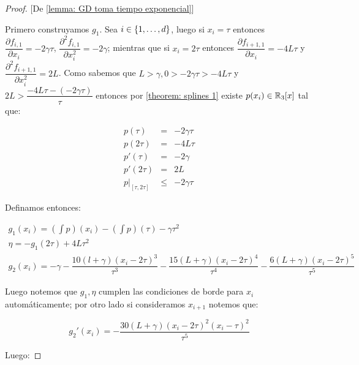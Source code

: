 \begin{proof}{[De \ref{lemma: GD toma tiempo exponencial}]}
	
	Primero construyamos $g_1$. Sea $i \in \left\lbrace1, \dots, d\right\rbrace$, luego si $x_i = \tau$ entonces $\dfrac{\partial f_{i,1}}{\partial x_i} = -2\gamma\tau$, $\dfrac{\partial^2 f_{i,1}}{\partial x_i^2} = -2\gamma$; mientras que si $x_i = 2\tau$ entonces $\dfrac{\partial f_{i+1,1}}{\partial x_i} = -4L\tau$ y $\dfrac{\partial^2 f_{i+1,1}}{\partial x_i^2} = 2L$. Como sabemos que $L > \gamma, 0 > -2\gamma\tau > -4L\tau$ y $2L > \dfrac{-4L\tau - \left(-2\gamma \tau\right)}{\tau}$ entonces por \ref{theorem: splines 1} existe $p(x_i) \in {\mathbb{R}}_3[x]$ tal que:
	
	\begin{equation*}
		\begin{aligned}
			p(\tau) & = & -2\gamma \tau \\
			p(2\tau) & = & -4L\tau \\
			p'(\tau) & = & -2\gamma \\
			p'(2\tau) & = & 2L \\
			p \vert_{\left[\tau, 2\tau\right]} & \leq & -2 \gamma \tau
		\end{aligned}
	\end{equation*}
	
	Definamos entonces:
	
	\begin{equation*}
	\begin{array}{l}
		g_1(x_i) = \left(\int p\right) (x_i) - \left(\int p\right) (\tau) - \gamma \tau^2 \\
		\eta = - g_1(2\tau) + 4L \tau^2 \\
		g_2(x_i) = -\gamma - \dfrac{10 (l+\gamma) \left(x_i - 2\tau\right)^3}{\tau^3} - \dfrac{15 (L+\gamma)\left(x_i - 2\tau\right)^4}{\tau^4} - \dfrac{6 (L+\gamma)\left(x_i - 2\tau\right)^5}{\tau^5}
	\end{array}
	\end{equation*}
	
	Luego notemos que $g_1, \eta$ cumplen las condiciones de borde para $x_i$ autom\'aticamente; por otro lado si consideramos $x_{i+1}$ notemos que:
	
	\begin{equation*}
		g_2' (x_i) = - \dfrac{30 \left(L+\gamma\right)\left(x_i - 2\tau\right)^2 \left(x_i - \tau\right)^2}{\tau^5}
	\end{equation*}
	
	Luego:
	

\end{proof}
